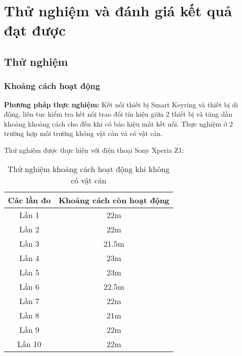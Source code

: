 \chapter{Thử nghiệm và đánh giá kết quả đạt được}

\ifpdf
    \graphicspath{{Chapter3/Figs/Raster/}{Chapter3/Figs/PDF/}{Chapter3/Figs/}}
\else
    \graphicspath{{Chapter3/Figs/Vector/}{Chapter3/Figs/}}
\fi

\section{Thử nghiệm}
\subsection{Khoảng cách hoạt động}

\textbf{Phương pháp thực nghiệm:} Kết nối thiết bị Smart Keyring và thiết bị di động, liên tuc kiểm tra kết nối trao đổi tín hiệu giữa 2 thiết bị và tăng dần khoảng khoảng cách cho đến khi có báo hiệu mất kết nối. Thực nghiệm ở 2 trường hợp môi trường không vật cản và có vật cản.

Thử nghiệm được thực hiện với điện thoại Sony Xperia Z1:

\begin{table}[!ht]
	\centering
	\begin{tabular}{|c | c|}
		\hline 
		Các lần đo & Khoảng cách còn hoạt động  \\ 
		\hline
		Lần 1 & 22m \\
		
		Lần 2 &	22m \\
		
		Lần 3 &	21.5m \\
		
		Lần 4 &	23m \\
		
		Lần 5 &	23m \\
		
		Lần 6 &	22.5m \\
		
		Lần 7 &	22m \\
		
		Lần 8 &	21m \\
		
		Lần 9 &	22m \\
		
		Lần 10 & 22m \\		
		
		\hline 		
	\end{tabular}
	\caption{Thử nghiệm khoảng cách hoạt động khi không có vật cản}		
	\label{table:distance-no}
\end{table}

